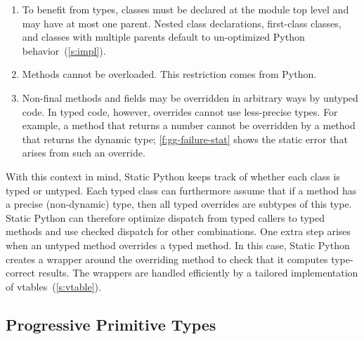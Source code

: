 \documentclass[english,cleveref,submission]{programming}
\newcommand{\SP}{Static Python}
\newcommand{\code}[1]{\texttt{#1}}
\begin{document}
\begin{enumerate}
  \item
    To benefit from types, classes must be declared at the module top level
    and may have at most one parent.
    Nested class declarations, first-class classes, and classes with
    multiple parents default to un-optimized Python behavior~(\cref{s:impl}).

  \item
    Methods cannot be overloaded.
    This restriction comes from Python.

  \item
    Non-final methods and fields may be overridden in arbitrary ways by untyped code.
    In typed code, however, overrides cannot use less-precise types.
    For example, a method that returns a number cannot be overridden by a method
    that returns the dynamic type; \cref{f:gg-failure-stat} shows the static error
    that arises from such an override.


\end{enumerate}
%
With this context in mind, \SP{} keeps track of whether each class is typed or untyped.
Each typed class can furthermore assume that if a method has a precise (non-dynamic)
type, then all typed overrides are subtypes of this type.
\SP{} can therefore optimize dispatch from typed callers to typed methods
and use checked dispatch for other combinations.
One extra step arises when an untyped method overrides a typed method.
In this case, \SP{} creates a wrapper around the overriding method to check
that it computes type-correct results.
The wrappers are handled efficiently by a tailored implementation of vtables~(\cref{s:vtable}).


\subsection{Progressive Primitive Types}
\label{s:c-types}

\end{document}
